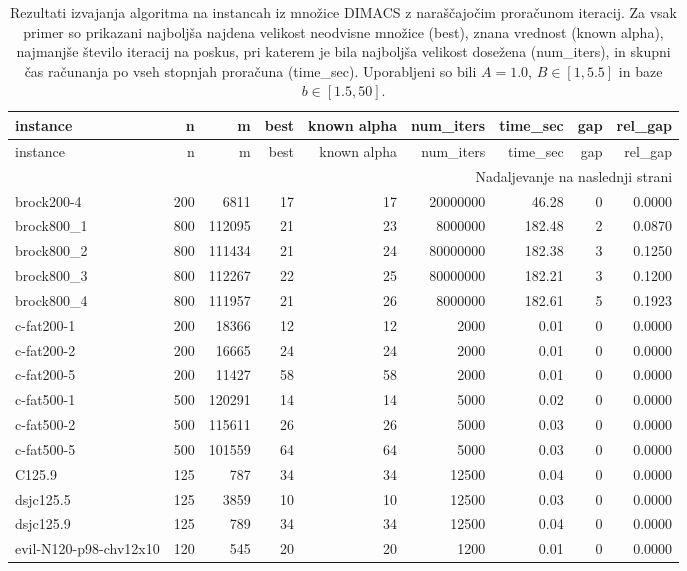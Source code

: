 {\setlength{\LTcapwidth}{\textwidth}
\begin{longtable}{lrrrrrrrr}
\caption{Rezultati izvajanja algoritma na instancah iz množice DIMACS z naraščajočim proračunom iteracij. Za vsak primer so prikazani najboljša najdena velikost neodvisne množice (best), znana vrednost (known alpha), najmanjše število iteracij na poskus, pri katerem je bila najboljša velikost dosežena (num\_iters), in skupni čas računanja po vseh stopnjah proračuna (time\_sec). Uporabljeni so bili $A = 1.0$, $B \in [1, 5.5]$ in baze $b \in [1.5, 50]$.} \label{tab:results_budget_tiers_dimacs} \\
\toprule
instance & n & m & best & known alpha & num\_iters & time\_sec & gap & rel\_gap \\
\midrule
\endfirsthead
\toprule
instance & n & m & best & known alpha & num\_iters & time\_sec & gap & rel\_gap \\
\midrule
\endhead
\midrule
\multicolumn{9}{r}{Nadaljevanje na naslednji strani} \\
\endfoot
\bottomrule
\endlastfoot
brock200-4 & 200 & 6811 & 17 & 17 & 20000000 & 46.28 & 0 & 0.0000 \\
brock800\_1 & 800 & 112095 & 21 & 23 & 8000000 & 182.48 & 2 & 0.0870 \\
brock800\_2 & 800 & 111434 & 21 & 24 & 80000000 & 182.38 & 3 & 0.1250 \\
brock800\_3 & 800 & 112267 & 22 & 25 & 80000000 & 182.21 & 3 & 0.1200 \\
brock800\_4 & 800 & 111957 & 21 & 26 & 8000000 & 182.61 & 5 & 0.1923 \\
c-fat200-1 & 200 & 18366 & 12 & 12 & 2000 & 0.01 & 0 & 0.0000 \\
c-fat200-2 & 200 & 16665 & 24 & 24 & 2000 & 0.01 & 0 & 0.0000 \\
c-fat200-5 & 200 & 11427 & 58 & 58 & 2000 & 0.01 & 0 & 0.0000 \\
c-fat500-1 & 500 & 120291 & 14 & 14 & 5000 & 0.02 & 0 & 0.0000 \\
c-fat500-2 & 500 & 115611 & 26 & 26 & 5000 & 0.03 & 0 & 0.0000 \\
c-fat500-5 & 500 & 101559 & 64 & 64 & 5000 & 0.03 & 0 & 0.0000 \\
C125.9 & 125 & 787 & 34 & 34 & 12500 & 0.04 & 0 & 0.0000 \\
dsjc125.5 & 125 & 3859 & 10 & 10 & 12500 & 0.03 & 0 & 0.0000 \\
dsjc125.9 & 125 & 789 & 34 & 34 & 12500 & 0.04 & 0 & 0.0000 \\
evil-N120-p98-chv12x10 & 120 & 545 & 20 & 20 & 1200 & 0.01 & 0 & 0.0000 \\

\end{longtable}}
